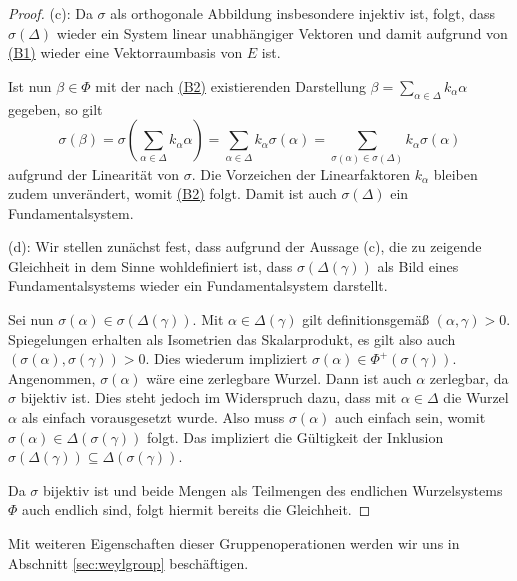 \begin{proof}
  (c): 
  Da $\sigma$ als orthogonale Abbildung insbesondere injektiv ist, folgt, dass $\sigma(\Delta)$ wieder ein System linear unabhängiger Vektoren und damit aufgrund von \hyperref[it:B1]{(B1)} wieder eine Vektorraumbasis von $E$ ist.
  
  Ist nun $\beta \in \Phi$ mit der nach \hyperref[it:B2]{(B2)} existierenden Darstellung $\beta = \sum_{\alpha \in \Delta} k_\alpha \alpha$ gegeben, so gilt
  \begin{displaymath}
  \sigma(\beta) 
    = \sigma(\sum_{\alpha \in \Delta} k_\alpha \alpha)
    = \sum_{\alpha \in \Delta} k_\alpha \sigma(\alpha)
    = \sum_{\sigma(\alpha) \in \sigma(\Delta)} k_\alpha \sigma(\alpha)
  \end{displaymath}
  aufgrund der Linearität von $\sigma$.
  Die Vorzeichen der Linearfaktoren $k_\alpha$ bleiben zudem unverändert, womit \hyperref[it:B2]{(B2)} folgt.
  Damit ist auch $\sigma(\Delta)$ ein Fundamentalsystem.

  (d):
  Wir stellen zunächst fest, dass aufgrund der Aussage (c), die zu zeigende Gleichheit in dem Sinne wohldefiniert ist, dass $\sigma(\Delta(\gamma))$ als Bild eines Fundamentalsystems wieder ein Fundamentalsystem darstellt.

  Sei nun $\sigma(\alpha) \in \sigma(\Delta(\gamma))$.
  Mit $\alpha \in \Delta(\gamma)$ gilt definitionsgemäß $(\alpha, \gamma) > 0$.
  Spiegelungen erhalten als Isometrien das Skalarprodukt, es gilt also auch $(\sigma(\alpha), \sigma(\gamma)) > 0$.
  Dies wiederum impliziert $\sigma(\alpha) \in \Phi^+(\sigma(\gamma))$.
  Angenommen, $\sigma(\alpha)$ wäre eine zerlegbare Wurzel.
  Dann ist auch $\alpha$ zerlegbar, da $\sigma$ bijektiv ist.
  Dies steht jedoch im Widerspruch dazu, dass mit $\alpha \in \Delta$ die Wurzel $\alpha$ als einfach vorausgesetzt wurde.
  Also muss $\sigma(\alpha)$ auch einfach sein, womit $\sigma(\alpha) \in \Delta(\sigma(\gamma))$ folgt.
  Das impliziert die Gültigkeit der Inklusion $\sigma(\Delta(\gamma)) \subseteq \Delta(\sigma(\gamma))$.
  
  Da $\sigma$ bijektiv ist und beide Mengen als Teilmengen des endlichen Wurzelsystems $\Phi$ auch endlich sind, folgt hiermit bereits die Gleichheit.
\end{proof}

Mit weiteren Eigenschaften dieser Gruppenoperationen werden wir uns in Abschnitt \ref{sec:weylgroup} beschäftigen.
